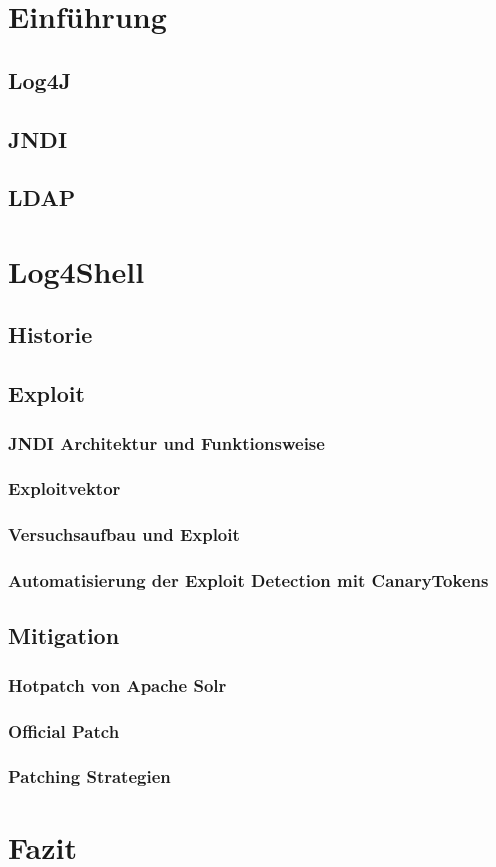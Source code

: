 

\section{Einführung}\label{sec:einfuhrung}

\subsection{Log4J}\label{subsec:log4j}

\subsection{JNDI}\label{subsec:jndi}

\subsection{LDAP}\label{subsec:ldap}

\section{Log4Shell}\label{sec:log4shell}
\subsection{Historie}\label{subsec:historie}
\subsection{Exploit}\label{subsec:exploit}
\subsubsection{JNDI Architektur und Funktionsweise}
\subsubsection{Exploitvektor}
\subsubsection{Versuchsaufbau und Exploit}
\subsubsection{Automatisierung der Exploit Detection mit CanaryTokens}
\subsection{Mitigation}\label{subsec:mitigation}

\subsubsection{Hotpatch von Apache Solr}
\subsubsection{Official Patch}
\subsubsection{Patching Strategien}
\section{Fazit}\label{sec:fazit}

%
